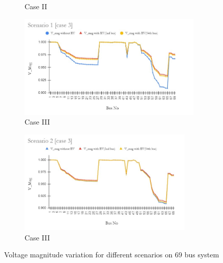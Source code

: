 \begin{figure}[!h]
\begin{subfigure}{.5\textwidth}
		\caption{Case II}
		\label{fig:RF2b}
	\end{subfigure}
	\begin{subfigure}{.5\textwidth}
		\centering
		\includegraphics[width=.97\linewidth,height= 4.95cm]{./Figures/69_sc1_case3}
		\caption{Case III}
		\label{fig:RFc}
	\end{subfigure}
	\begin{subfigure}{.5\textwidth}
		\centering
		\includegraphics[width=.97\linewidth,height= 4.95cm]{./Figures/69_sc2_case3}
		\caption{Case III}
		\label{fig:RF2c}
	\end{subfigure}
	\caption{ Voltage magnitude variation for different scenarios on 69 bus system  }
	\label{fig:loadprofile69}
\end{figure} 
	
	


		
	
	
	